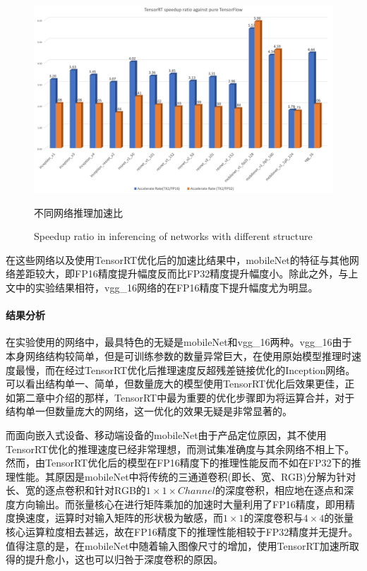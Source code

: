 \begin{figure}
	\centering
	\includegraphics[width=15cm]{figures/TENSORRTRATIO.jpg}
	\renewcommand{\thefigure}{\arabic{section}-\arabic{figure} }
	\renewcommand{\figurename}{图}
	\caption{不同网络推理加速比}
	\addtocounter{figure}{-1}
	\renewcommand{\thefigure}{\arabic{section}-\arabic{figure} }
	\renewcommand{\figurename}{Figure}
	\caption{Speedup ratio in inferencing of networks with different structure}
	\label{Fig.INFERSPEEDUP}
\end{figure}
\par 在这些网络以及使用TensorRT优化后的加速比结果中，mobileNet的特征与其他网络差距较大，即FP16精度提升幅度反而比FP32精度提升幅度小。除此之外，与上文中的实验结果相符，vgg\_16网络的在FP16精度下提升幅度尤为明显。
\paragraph{结果分析}
\par 在实验使用的网络中，最具特色的无疑是mobileNet和vgg\_16两种。vgg\_16由于本身网络结构较简单，但是可训练参数的数量异常巨大，在使用原始模型推理时速度最慢，而在经过TensorRT优化后推理速度反超残差链接优化的Inception网络。可以看出结构单一、简单，但数量庞大的模型使用TensorRT优化后效果更佳，正如第二章中介绍的那样，TensorRT中最为重要的优化步骤即为将运算合并，对于结构单一但数量庞大的网络，这一优化的效果无疑是非常显著的。
\par 而面向嵌入式设备、移动端设备的mobileNet由于产品定位原因，其不使用TensorRT优化的推理速度已经非常理想，而测试集准确度与其余网络不相上下。然而，由TensorRT优化后的模型在FP16精度下的推理性能反而不如在FP32下的推理性能。其原因是mobileNet中将传统的三通道卷积(即长、宽、RGB)分解为针对长、宽的逐点卷积和针对RGB的$ 1\times 1\times Channel $的深度卷积，相应地在逐点和深度方向输出。而张量核心在进行矩阵乘加的加速时大量利用了FP16精度，即用精度换速度，运算时对输入矩阵的形状极为敏感，而$ 1\times 1 $的深度卷积与$ 4 \times 4 $的张量核心运算粒度相去甚远，故在FP16精度下的推理性能相较于FP32精度并无提升。值得注意的是，在mobileNet中随着输入图像尺寸的增加，使用TensorRT加速所取得的提升愈小，这也可以归咎于深度卷积的原因。
